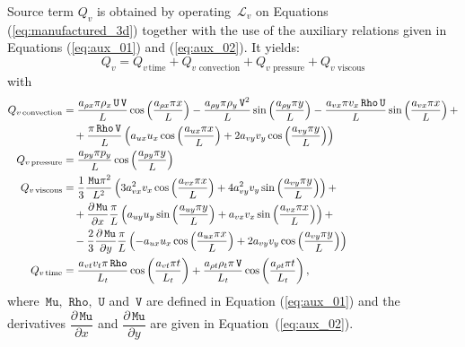 \documentclass[10pt]{article}
\newcommand{\diff}[2] {\dfrac{\partial #1}{\partial #2}}
\newcommand{\Rho}{\,\mathtt{Rho}}
\newcommand{\U}{\,\mathtt{U}}
\newcommand{\V}{\,\mathtt{V}}
\newcommand{\Lo}{\,\mathcal{L}}
\newcommand{\Mu}{\,\mathtt{Mu}}
\newcommand{\DMuDx}{\diff{\Mu}{x}}
\newcommand{\DMuDy}{\diff{\Mu}{y}}
\newcommand{\timee}{\,\text{time}}
\newcommand{\convection}{\,\text{convection}}
\newcommand{\viscous}{\,\text{viscous}}
\newcommand{\pressure}{\,\text{pressure}}
\begin{document}
Source term $Q_v$ is obtained by operating $\Lo_{v}$ on Equations  (\ref{eq:manufactured_3d}) together with the use of the  auxiliary relations given in Equations (\ref{eq:aux_01}) and (\ref{eq:aux_02}). It yields:
\begin{equation*}
Q_v = Q_{v \, \text{time}}+Q_{v \, \convection}+Q_{v \, \pressure }+Q_{v \, \viscous }
\end{equation*}
with
\begin{equation*}
\begin{split}
 Q_{v \convection} &= \dfrac{a_{\rho x} \pi \rho_x \U \V }{L} \cos\left(\dfrac{a_{\rho x} \pi x}{L}\right)
-\dfrac{a_{\rho y} \pi \rho_y \V^2 }{L} \sin\left(\dfrac{a_{\rho y} \pi y}{L}\right)
-\dfrac{a_{vx} \pi v_x \Rho \U }{L} \sin\left(\dfrac{a_{vx} \pi x}{L}\right) +\\
	&\quad+\dfrac{\pi \Rho \V}{L}\left(a_{ux} u_x \cos\left(\dfrac{a_{ux} \pi x}{L}\right)+2 a_{vy} v_y \cos\left(\dfrac{a_{vy} \pi y}{L}\right)\right)   \\ \vspace{15pt}
%
Q_{v \pressure} &= \dfrac{a_{py} \pi p_y }{L}\cos\left(\dfrac{a_{py} \pi y}{L}\right) \\ \vspace{15pt}
%
Q_{v \viscous} &= \dfrac{1}{3} \dfrac{\Mu \pi^2}{L^2} \left(3 a_{vx}^2 v_x \cos\left(\dfrac{a_{vx} \pi x}{L}\right)+4  a_{vy}^2 v_y \sin\left(\dfrac{a_{vy} \pi y}{L}\right)\right)  +\\
	&\quad+ \DMuDx \dfrac{\pi}{L}\left(a_{uy} u_y \sin\left(\dfrac{a_{uy} \pi y}{L}\right)+a_{vx} v_x \sin\left(\dfrac{a_{vx} \pi x}{L}\right)\right)  +\\
	&\quad -\dfrac{2}{3} \DMuDy \dfrac{\pi}{L}\left(-a_{ux} u_x \cos\left(\dfrac{a_{ux} \pi x}{L}\right)+2 a_{vy} v_y \cos\left(\dfrac{a_{vy} \pi y}{L}\right)\right)   \\ \vspace{15pt}
%
Q_{v \timee} &= \dfrac{a_{vt} v_t \pi \Rho }{L_t}\cos\left(\dfrac{a_{vt} \pi t}{L_t}\right)  +\dfrac{a_{\rho t} \rho_t \pi \V }{L_t}\cos\left(\dfrac{a_{\rho t} \pi t}{L_t}\right) ,
\end{split}
\end{equation*}
%
where $\Mu,\, \Rho,\,\U$ and $\V$  are defined in Equation (\ref{eq:aux_01}) and the derivatives $\DMuDx$ and $\DMuDy$ are given in Equation~(\ref{eq:aux_02}).
\end{document}
